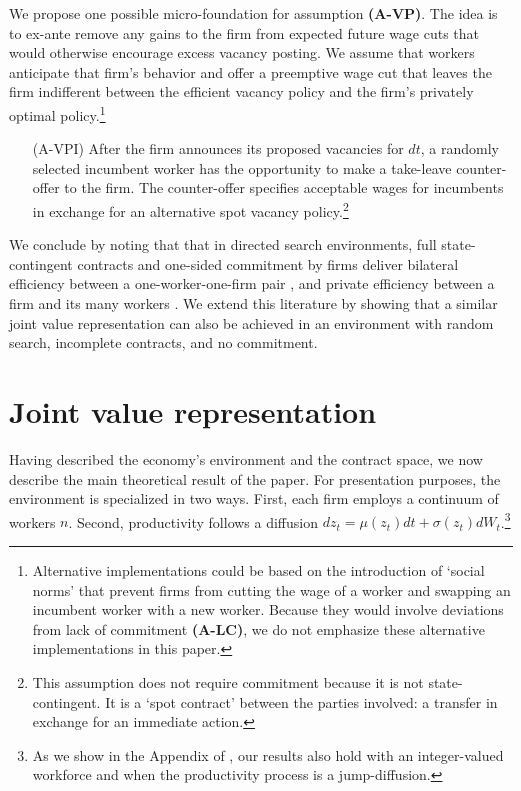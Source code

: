 We propose one possible micro-foundation for assumption {\bf(A-VP)}.
The idea is to ex-ante remove any gains to the firm from expected future wage cuts that would otherwise encourage excess vacancy posting.
We assume that workers anticipate that firm's behavior and offer a preemptive wage cut that leaves the firm indifferent between the efficient vacancy policy and the firm's privately optimal policy.\footnote{
    Alternative implementations could be based on the introduction of `social norms' that prevent firms from cutting the wage of a worker and swapping an incumbent worker with a new worker.
    Because they would involve deviations from lack of commitment {\bf(A-LC)}, we do not emphasize these alternative implementations in this paper.}
\begin{itemize}
    \item[(A-VPI)] After the firm announces its proposed vacancies for $dt$, a randomly selected incumbent worker has the opportunity to make a take-leave counter-offer to the firm.
    The counter-offer specifies acceptable wages for incumbents in exchange for an alternative spot vacancy policy.\footnote{
            This assumption does not require commitment because it is not state-contingent.
            It is a `spot contract' between the parties involved: a transfer in exchange for an immediate action.}
\end{itemize}

We conclude by noting that that in directed search environments, full state-contingent contracts and one-sided commitment by firms deliver bilateral efficiency between a one-worker-one-firm pair \citep{menzio2011efficient}, and private efficiency between a firm and its many workers \citep{schaal2017uncertainty}. We extend this literature by showing that a similar joint value representation can also be achieved in an environment with random search, incomplete contracts, and no commitment.

\section{Joint value representation}\label{sec:jointvalue}
Having described the economy's environment and the contract space, we now describe the main theoretical result of the paper.
For presentation purposes, the environment is specialized in two ways.
First, each firm employs a continuum of workers $n$.
Second, productivity follows a diffusion $dz_t = \mu(z_t) dt + \sigma(z_t) dW_t$.\footnote{
As we show in the Appendix of \citet{BEMVworkingpaper}, our results also hold with an integer-valued workforce and when the productivity process is a jump-diffusion.}

